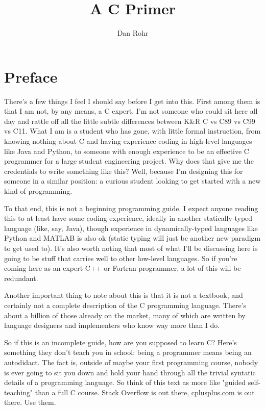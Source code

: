 \documentclass[ebook,11pt,oneside,openany]{memoir}
\title{A C Primer}
\author{Dan Rohr}
\begin{document}
\maketitle

\chapter*{Preface}

There's a few things I feel I should say before I get into this. First among them is that I am not, by any means, a C expert. I'm not someone who could sit here all day and rattle off all the little subtle differences between K\&R C vs C89 vs C99 vs C11. What I am is a student who has gone, with little formal instruction, from knowing nothing about C and having experience coding in high-level languages like Java and Python, to someone with enough experience to be an effective C programmer for a large student engineering project. Why does that give me the credentials to write something like this? Well, because I'm designing this for someone in a similar position: a curious student looking to get started with a new kind of programming.

To that end, this is not a beginning programming guide. I expect anyone reading this to at least have some coding experience, ideally in another statically-typed language (like, say, Java), though experience in dynamically-typed languages like Python and MATLAB is also ok (static typing will just be another new paradigm to get used to). It's also worth noting that most of what I'll be discussing here is going to be stuff that carries well to other low-level languages. So if you're coming here as an expert C++ or Fortran programmer, a lot of this will be redundant.

Another important thing to note about this is that it is not a textbook, and certainly not a complete description of the C programming language. There's about a billion of those already on the market, many of which are written by language designers and implementers who know way more than I do.

So if this is an incomplete guide, how are you supposed to learn C? Here's something they don't teach you in school: being a programmer means being an autodidact. The fact is, outside of maybe your first programming course,  nobody is ever going to sit you down and hold your hand through all the trivial syntatic details of a programming language. So think of this text as more like "guided self-teaching" than a full C course. Stack Overflow is out there, \url{cplusplus.com} is out there. Use them.
\end{document}
